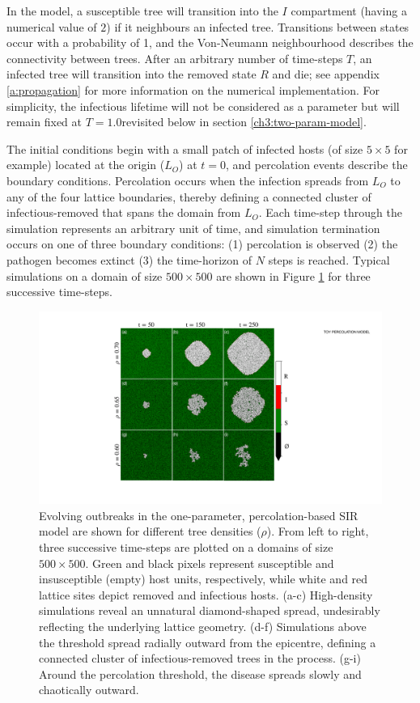In the model, a susceptible tree will transition into the $I$ compartment (having a numerical value of $2$) if it neighbours an infected tree. Transitions between states occur with a probability of 1, and the Von-Neumann neighbourhood describes the connectivity between trees. After an arbitrary number of time-steps $T$, an infected tree will transition into the removed state $R$ and die; see appendix \ref{a:propagation} for more information on the numerical implementation. For simplicity, the infectious lifetime will not be considered as a parameter but will remain fixed at $T=1.0$\textemdash revisited below in section \ref{ch3:two-param-model}.

The initial conditions begin with a small patch of infected hosts (of size $5\times5$ for example) located at the origin ($L_O$) at $t=0$, and percolation events describe the boundary conditions. 
Percolation occurs when the infection spreads from $L_O$ to any of the four lattice boundaries, thereby defining a connected cluster of infectious-removed that spans the domain from $L_O$.
Each time-step through the simulation represents an arbitrary unit of time, and simulation termination occurs on one of three boundary conditions: 
(1) percolation is observed 
(2) the pathogen becomes extinct
(3) the time-horizon of $N$ steps is reached.
Typical simulations on a domain of size $500 \times 500$ are shown in Figure \ref{fig:ch3-perc-spread} for three successive time-steps. 

\begin{figure}
    \centering
    \includegraphics[scale=0.50]{chapter3/figures/figure1-1param-perc.pdf}
    \caption{
        Evolving outbreaks in the one-parameter, percolation-based SIR model are shown for different tree densities ($\rho$).
        From left to right, three successive time-steps are plotted on a domains of size $500 \times 500$.
        Green and black pixels represent susceptible and insusceptible (empty) host units, respectively, 
        while white and red lattice sites depict removed and infectious hosts. 
        (a-c) High-density simulations reveal an unnatural diamond-shaped spread, undesirably reflecting the underlying lattice geometry.
        (d-f) Simulations above the threshold spread radially outward from the epicentre, defining a connected cluster of infectious-removed trees in the process. (g-i) Around the percolation threshold, the disease spreads slowly and chaotically outward. 
        }
    \label{fig:ch3-perc-spread}
\end{figure}

